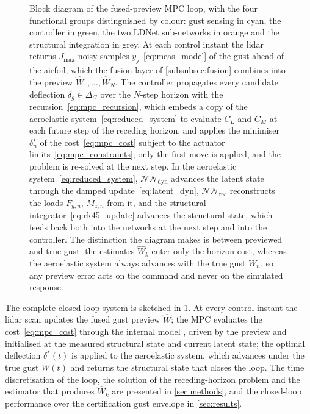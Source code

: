 \begin{figure}[t]
\begin{tikzpicture}
\end{tikzpicture}
\caption{Block diagram of the fused-preview MPC loop, with the four functional
groups distinguished by colour: gust sensing in cyan, the controller in green, the
two LDNet sub-networks in orange and the structural integration in grey. At each
control instant the lidar returns $J_{\max}$ noisy samples $y_j$~\eqref{eq:meas_model}
of the gust ahead of the airfoil, which the fusion layer of \cref{subsubsec:fusion}
combines into the preview $\widehat{W}_1,\dots,\widehat{W}_N$. The controller
propagates every candidate deflection $\delta_g\in\Delta_G$ over the $N$-step horizon
with the recursion~\eqref{eq:mpc_recursion}, which embeds a copy of the aeroelastic
system~\eqref{eq:reduced_system} to evaluate $C_L$ and $C_M$ at each future step of
the receding horizon, and applies the minimiser $\delta^\star_n$
of the cost~\eqref{eq:mpc_cost} subject to the actuator limits~\eqref{eq:mpc_constraints};
only the first move is applied, and the problem is re-solved at the next step. In the
aeroelastic system~\eqref{eq:reduced_system}, $\mathcal{NN}_\mathrm{dyn}$ advances the
latent state through the damped update~\eqref{eq:latent_dyn}, $\mathcal{NN}_\mathrm{rec}$
reconstructs the loads $F_{y,n}$, $M_{z,n}$ from it, and the structural
integrator~\eqref{eq:rk45_update} advances the structural state, which feeds back both
into the networks at the next step and into the controller. The distinction the diagram
makes is between previewed and true gust: the estimates $\widehat{W}_k$ enter only the
horizon cost, whereas the aeroelastic system always advances with the true gust $W_n$,
so any preview error acts on the command and never on the simulated response.}
\label{fig:control_loop}
\end{figure}

The complete closed-loop system is sketched in \cref{fig:control_loop}. At every control instant the lidar scan updates the fused gust preview $\widehat{W}$; the MPC evaluates the cost~\eqref{eq:mpc_cost} through the internal model , driven by the preview and initialised at the measured structural state and current latent state; the optimal deflection $\delta^*(t)$ is applied to the aeroelastic system, which advances under the true gust $W(t)$ and returns the structural state that closes the loop. The time discretisation of the loop, the solution of the receding-horizon problem and the estimator that produces $\widehat{W}_k$ are presented in \cref{sec:methods}, and the closed-loop performance over the certification gust envelope in \cref{sec:results}.
